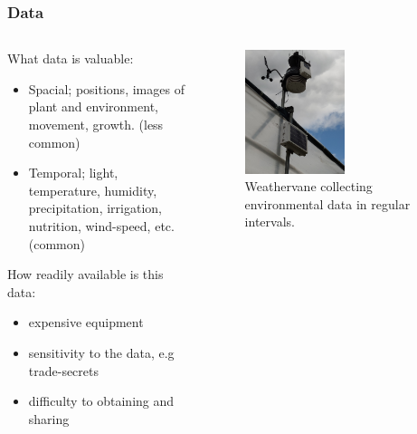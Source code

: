 \documentclass[aspectratio=169]{beamer}
\begin{document}
  \begin{frame}
    \frametitle{Data}
    \begin{columns}
      \begin{column}{0.5\textwidth}
        What data is valuable:
        \begin{itemize}
          \item Spacial; positions, images of plant and environment, movement, growth. (less common)
          \item Temporal; light, temperature, humidity, precipitation, irrigation, nutrition, wind-speed, etc. (common)
        \end{itemize}
        How readily available is this data:
        \begin{itemize}
          \item expensive equipment
          \item sensitivity to the data, e.g trade-secrets
          \item difficulty to obtaining and sharing
        \end{itemize}
      \end{column}
      \begin{column}{0.5\textwidth}
        \begin{figure}[th!]
          \centering
          \includegraphics[width=0.55\textwidth]{weather.jpg}
          \caption{Weathervane collecting environmental data in regular intervals. \autocite{repository}}
          \label{fig:yield}
        \end{figure}
      \end{column}
    \end{columns}
  \end{frame}
\end{document}
